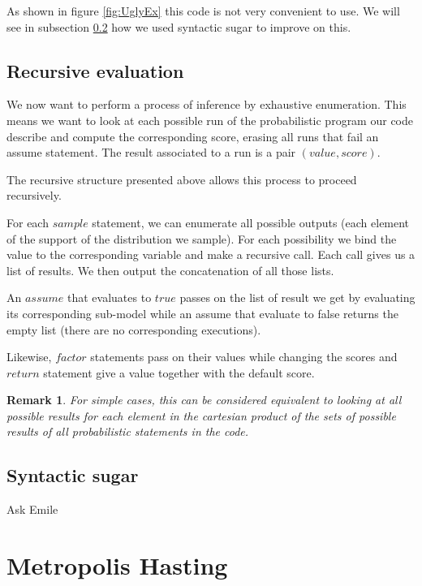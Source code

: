 \documentclass{article}
\newcommand\SC[1]{{\color{violet}{\it \bf Simon :} #1}}
\newtheorem{remark}{Remark}
\begin{document}
	As shown in figure \ref{fig:UglyEx} this code is not very convenient to use. We will see in subsection \ref{subseq:sugar} how we used syntactic sugar to improve on this.

	\subsection{Recursive evaluation}

	We now want to perform a process of inference by exhaustive enumeration.
	This means we want to look at each possible run of the probabilistic program our code describe and compute the corresponding score, erasing all runs that fail an assume statement.
	The result associated to a run is a pair $(value, score)$.

	The recursive structure presented above allows this process to proceed recursively.

	For each $sample$ statement, we can enumerate all possible outputs (each element of the support of the distribution we sample). For each possibility we bind the value to the corresponding variable and make a recursive call.
	Each call gives us a list of results. We then output the concatenation of all those lists.

	An $assume$ that evaluates to $true$ passes on the list of result we get by evaluating its corresponding sub-model while an assume that evaluate to false returns the empty list (there are no corresponding executions).

	Likewise, $factor$ statements pass on their values while changing the scores and $return$ statement give a value together with the default score.

	\begin{remark}
	  For simple cases, this can be considered equivalent to looking at all possible results for each element in the cartesian product of the sets of possible results of all probabilistic statements in the code.
	\end{remark}

	\subsection{Syntactic sugar}
	\label{subseq:sugar}

	\SC{Ask Emile}

\section{Metropolis Hasting}
\end{document}
